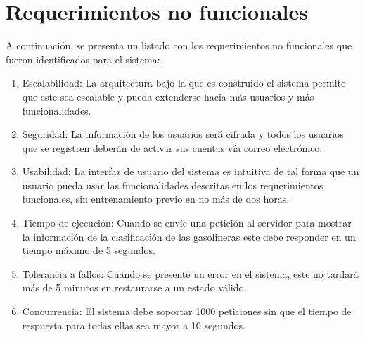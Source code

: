 \section{Requerimientos no funcionales}
A continuación, se presenta un listado con los requerimientos no funcionales que fueron identificados para el sistema:
\begin{enumerate}[label=RNF\arabic*.]
	\item Escalabilidad: La arquitectura bajo la que es construido el sistema permite que este sea escalable y pueda extenderse hacia más usuarios y más funcionalidades.
	\item Seguridad: La información de los usuarios será cifrada y todos los usuarios que se registren deberán de activar sus cuentas vía correo electrónico.
	\item Usabilidad: La interfaz de usuario del sistema es intuitiva de tal forma que un usuario pueda usar las funcionalidades descritas en los requerimientos funcionales, sin entrenamiento previo en no más de dos horas.
	\item Tiempo de ejecución: Cuando se envíe una petición al servidor para mostrar la información de la clasificación de las gasolineras este debe responder en un tiempo máximo de 5 segundos.
	\item Tolerancia a fallos: Cuando se presente un error en el sistema, este no tardará más de 5 minutos en restaurarse a un estado válido.
	\item Concurrencia: El sistema debe soportar 1000 peticiones sin que el tiempo de respuesta para todas ellas sea mayor a 10 segundos.
\end{enumerate}